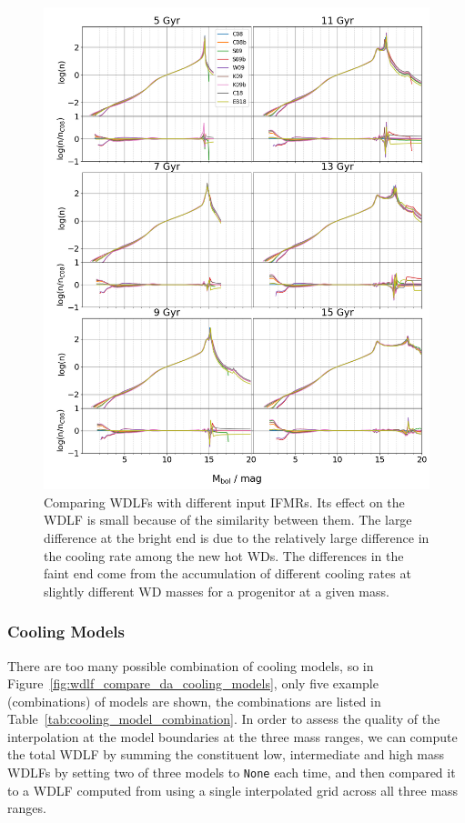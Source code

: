 \documentclass[fleqn,usenatbib]{rasti}
\begin{document}
\begin{figure}
    \centering
    \includegraphics[width=\textwidth]{wdlf_compare_ifmr.png}
    \caption{Comparing WDLFs with different input IFMRs. Its effect on the WDLF
    is small because of the similarity between them. The large difference at
    the bright end is due to the relatively large difference in the cooling
    rate among the new hot WDs. The differences in the faint end come from the
    accumulation of different cooling rates at slightly different WD masses for
    a progenitor at a given mass.}
    \label{fig:wdlf_compare_ifmr}
\end{figure}

\subsubsection{Cooling Models}
There are too many possible combination of cooling models, so in
Figure~\ref{fig:wdlf_compare_da_cooling_models}, only five example
(combinations) of models are shown, the combinations are listed in
Table~\ref{tab:cooling_model_combination}. In order to assess the quality of
the interpolation at the model boundaries at the three mass ranges, we can
compute the total WDLF by summing the constituent low, intermediate and high
mass WDLFs by setting two of three models to \texttt{None} each time, and then
compared it to a WDLF computed from using a single interpolated grid across
all three mass ranges.
\end{document}

